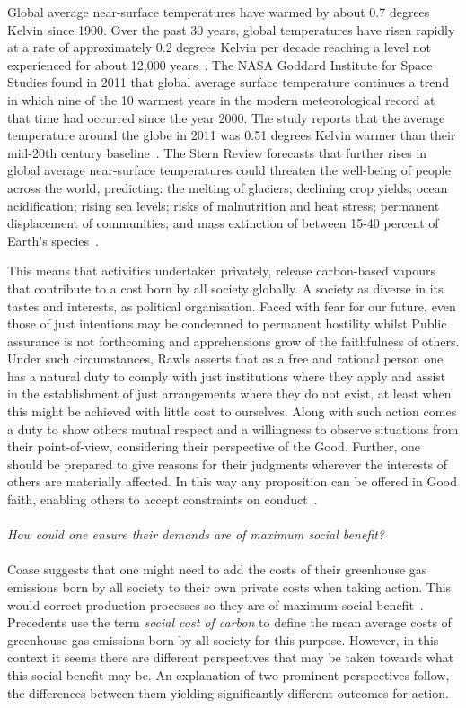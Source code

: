 \documentclass[11pt, oneside]{book}   	%
\begin{document}
Global average near-surface temperatures have warmed by about 0.7 degrees Kelvin since 1900.
Over the past 30 years, global temperatures have risen rapidly at a rate of approximately 0.2 degrees Kelvin per decade reaching a level not experienced for about 12,000 years~\cite{hj1}.
The NASA Goddard Institute for Space Studies found in 2011 that global average surface temperature continues a trend in which nine of the 10 warmest years in the modern meteorological record at that time had occurred since the year 2000.
The study reports that the average temperature around the globe in 2011 was 0.51 degrees Kelvin warmer than their mid-20th century baseline~\cite{candm1}.
The Stern Review forecasts that further rises in global average near-surface temperatures could threaten the well-being of people across the world, predicting: the melting of glaciers; declining crop yields; ocean acidification; rising sea levels; risks of malnutrition and heat stress; permanent displacement of communities; and mass extinction of between 15-40 percent of Earth's species~\cite{ns1}.\

This means that activities undertaken privately, release carbon-based vapours that contribute to a cost born by all society globally.
A society as diverse in its tastes and interests, as political organisation.
Faced with fear for our future, even those of just intentions may be condemned to permanent hostility whilst Public assurance is not forthcoming and apprehensions grow of the faithfulness of others.
Under such circumstances, Rawls asserts that as a free and rational person one has a natural duty to comply with just institutions where they apply and assist in the establishment of just arrangements where they do not exist, at least when this might be achieved with little cost to ourselves.
Along with such action comes a duty to show others mutual respect and a willingness to observe situations from their point-of-view, considering their perspective of the Good.
Further, one should be prepared to give reasons for their judgments wherever the interests of others are materially affected. In this way any proposition can be offered in Good faith, enabling others to accept constraints on conduct~\cite{jr1}.\\
\\
 \emph{How could one ensure their demands are of maximum social benefit?}\\
 \\
Coase suggests that one might need to add the costs of their greenhouse gas emissions born by all society to their own private costs when taking action.
This would correct production processes so they are of maximum social benefit~\cite{rc1}.
Precedents use the term \emph{social cost of carbon} to define the mean average costs of greenhouse gas emissions born by all society for this purpose.
However, in this context it seems there are different perspectives that may be taken towards what this social benefit may be.
An explanation of two prominent perspectives follow, the differences between them yielding significantly different outcomes for action.
\end{document}
